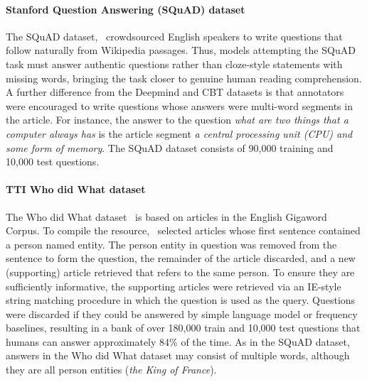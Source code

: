 \documentclass[11pt,letterpaper]{article}
\begin{document}
\paragraph{Stanford Question Answering (SQuAD) dataset} The SQuAD dataset,~ crowdsourced English speakers to write questions that follow naturally from Wikipedia passages. Thus, models attempting the SQuAD task must answer authentic questions rather than cloze-style statements with missing words, bringing the task closer to genuine human reading comprehension. A further difference from the Deepmind and CBT datasets is that annotators were encouraged to write questions whose answers were multi-word segments in the article. For instance, the answer to the question \emph{what are two things that a computer always has} is the article segment \emph{a central processing unit (CPU) and some form of memory}. The SQuAD dataset consists of 90,000 training and 10,000 test questions. 

 \paragraph{TTI Who did What dataset} The Who did What dataset~\cite{onishi2016did} is based on articles in the English Gigaword Corpus. To compile the resource,~ selected articles whose first sentence contained a person named entity. The person entity in question was removed from the sentence to form the question, the remainder of the article discarded, and a new (supporting) article retrieved that refers to the same person. To ensure they are sufficiently informative, the supporting articles were retrieved via an IE-style string matching procedure in which the question is used as the query. Questions were discarded if they could be answered by simple language model or frequency baselines, resulting in a bank of over 180,000 train and 10,000 test questions that humans can answer approximately 84\% of the time. As in the SQuAD dataset, answers in the Who did What dataset may consist of multiple words, although they are all person entities (\emph{the King of France}).
\end{document}
